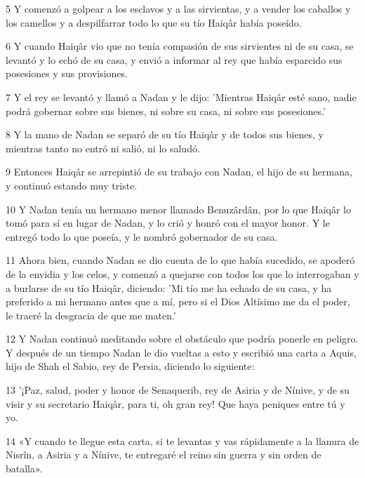 \par 5 Y comenzó a golpear a los esclavos y a las sirvientas, y a vender los caballos y los camellos y a despilfarrar todo lo que su tío Haiqâr había poseído.

\par 6 Y cuando Haiqâr vio que no tenía compasión de sus sirvientes ni de su casa, se levantó y lo echó de su casa, y envió a informar al rey que había esparcido sus posesiones y sus provisiones.

\par 7 Y el rey se levantó y llamó a Nadan y le dijo: 'Mientras Haiqâr esté sano, nadie podrá gobernar sobre sus bienes, ni sobre su casa, ni sobre sus posesiones.'

\par 8 Y la mano de Nadan se separó de su tío Haiqâr y de todos sus bienes, y mientras tanto no entró ni salió, ni lo saludó.

\par 9 Entonces Haiqâr se arrepintió de su trabajo con Nadan, el hijo de su hermana, y continuó estando muy triste.

\par 10 Y Nadan tenía un hermano menor llamado Benuzârdân, por lo que Haiqâr lo tomó para sí en lugar de Nadan, y lo crió y honró con el mayor honor. Y le entregó todo lo que poseía, y le nombró gobernador de su casa.

\par 11 Ahora bien, cuando Nadan se dio cuenta de lo que había sucedido, se apoderó de la envidia y los celos, y comenzó a quejarse con todos los que lo interrogaban y a burlarse de su tío Haiqâr, diciendo: 'Mi tío me ha echado de su casa, y ha preferido a mi hermano antes que a mí, pero si el Dios Altísimo me da el poder, le traeré la desgracia de que me maten.'

\par 12 Y Nadan continuó meditando sobre el obstáculo que podría ponerle en peligro. Y después de un tiempo Nadan le dio vueltas a esto y escribió una carta a Aquis, hijo de Shah el Sabio, rey de Persia, diciendo lo siguiente:

\par 13 '¡Paz, salud, poder y honor de Senaquerib, rey de Asiria y de Nínive, y de su visir y su secretario Haiqâr, para ti, oh gran rey! Que haya peniques entre tú y yo.

\par 14 «Y cuando te llegue esta carta, si te levantas y vas rápidamente a la llanura de Nisrîn, a Asiria y a Nínive, te entregaré el reino sin guerra y sin orden de batalla».

